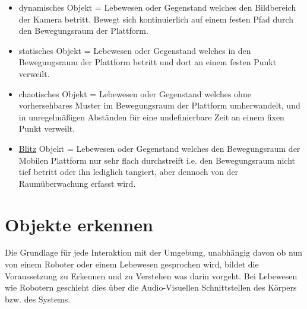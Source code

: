 		\begin{itemize}
		\item dynamisches Objekt = Lebewesen oder Gegenstand welches den Bildbereich der Kamera betritt. Bewegt sich kontinuierlich auf einem festen Pfad durch den Bewegungsraum der Plattform.
		\item statisches Objekt = Lebewesen oder Gegenstand welches in den Bewegungsraum der Plattform betritt und dort an einem festen Punkt verweilt.
		\item chaotisches Objekt = Lebewesen oder Gegenstand welches ohne vorhersehbares Muster im Bewegungsraum der Plattform umherwandelt, und in unregelmäßigen Abständen für eine undefinierbare Zeit an einem fixen Punkt verweilt.
		\item \underline{Blitz} Objekt = Lebewesen oder Gegenstand welches den Bewegungsraum der Mobilen Plattform nur sehr flach durchstreift i.e. den Bewegungsraum nicht tief betritt oder ihn lediglich tangiert, aber dennoch von der Raumüberwachung erfasst wird.
		\end{itemize}
		
		
		\section{Objekte erkennen}
		Die Grundlage für jede Interaktion mit der Umgebung, unabhängig davon ob nun von einem Roboter oder einem Lebewesen gesprochen wird, bildet die Voraussetzung zu Erkennen und zu Verstehen was darin vorgeht. Bei Lebewesen wie Robotern geschieht dies über die Audio-Visuellen Schnittstellen des Körpers bzw. des Systems.
